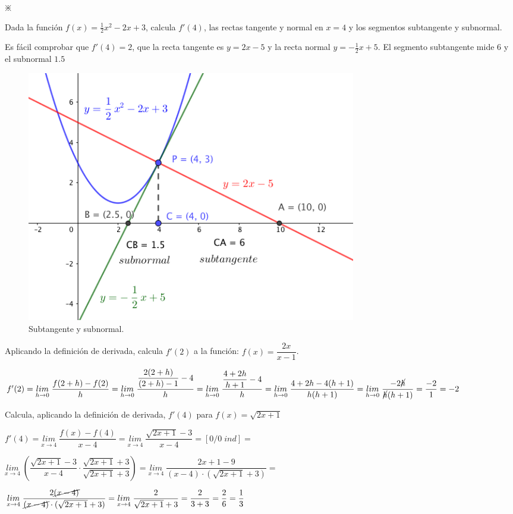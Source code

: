 	\begin{ejem}  $\divideontimes$
	
	Dada la función $f(x)=\frac 1 2 x^2-2x+3$, calcula	$f'(4)$, las rectas tangente y normal en $x=4$ y los segmentos subtangente y subnormal.
	
	Es fácil comprobar que $f'(4)=2$, que la recta tangente es $y=2x-5$ y la recta normal $y=-\frac 1 2 x +5$. El segmento subtangente mide $6$ y el subnormal $1.5$
	
		\begin{figure}[H]
			\centering
			\includegraphics[width=0.7\textwidth]{imagenes/imagenes04/T04IM05.png}
			\caption{Subtangente y subnormal.}
		\end{figure}
	
	\end{ejem}
	
	\begin{ejem} Aplicando la definición de derivada, calcula $f'(2)$ a la función: $f(x)=\dfrac {2x}{x-1}$.
	
	$f'(2)=\underset {h\to 0}{lim}\;{\dfrac {f(2+h)-f(2)}{h}}= \underset {h\to 0}{lim}\;{\dfrac { \dfrac{2(2+h)}{(2+h)-1}-4}{h}} = \underset {h\to 0}{lim}\;{\dfrac {\dfrac {4+2h}{h+1}-4}{h}}=\underset {h\to 0}{lim}\;{\dfrac {4+2h-4(h+1)}{h(h+1)}}=\underset {h\to 0}{lim}\;{\dfrac {-2 \cancel{h}}{\cancel{h}(h+1)}}=\dfrac {-2}{1}=-2$
		
	\end{ejem}
	
	\begin{ejem} Calcula, aplicando la definición de derivada, $f'(4)$ para $f(x)=\sqrt{2x+1}$
	
	$f'(4)=\underset {x \to 4}{lim}\; {\dfrac {f(x)-f(4)}{x-4}}= \underset {x \to 4}{lim}\; {\dfrac {\sqrt{2x+1}-3}{x-4}}=[0/0\; ind]= $
	
	$\underset {x \to 4}{lim}\; {\left( \dfrac {\sqrt{2x+1}-3}{x-4}\cdot \dfrac {\sqrt{2x+1}+3}{\sqrt{2x+1}+3} \right) } = \underset {x \to 4}{lim}\; {\dfrac {2x+1-9}{(x-4)\cdot(\sqrt{2x+1}+3) }} = $
	
	$\underset {x \to 4}{lim}\; {\dfrac {2\cancel{(x-4)}}{\cancel{(x-4)}\cdot(\sqrt{2x+1}+3) }}= \underset {x \to 4}{lim}\; {\dfrac {2}{\sqrt{2x+1}+3 }}=\dfrac {2}{3+3}=\dfrac 2 6 =\dfrac 1 3$
		
	\end{ejem}
	
